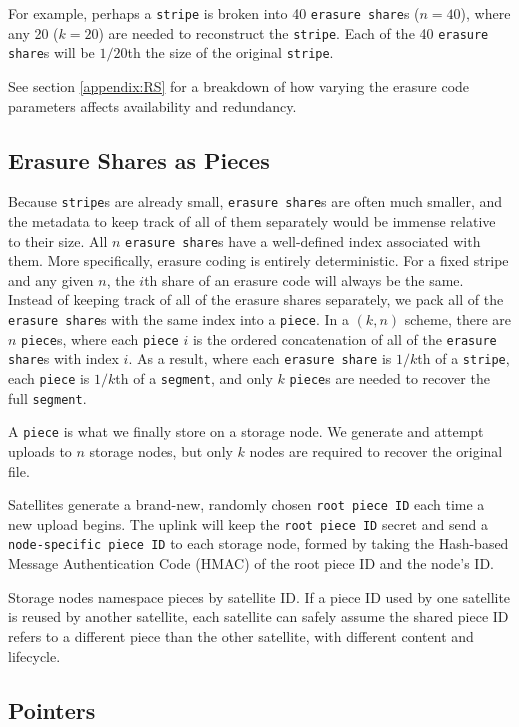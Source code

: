 \documentclass[11pt,fleqn,openany]{book}
\newcommand{\x}[1]{{\tt #1}} \newcommand{\code}[1]{{\em #1}}
\begin{document}
For example, perhaps a \x{stripe} is broken into 40 \x{erasure share}s
($n=40$), where any 20 ($k=20$) are needed to reconstruct the \x{stripe}. Each
of the 40 \x{erasure share}s will be $1/20$th the size of the original
\x{stripe}.

See section \ref{appendix:RS} for a breakdown of how varying the erasure code
parameters affects availability and redundancy.

\subsection{Erasure Shares as Pieces}

Because \x{stripe}s are already small, \x{erasure share}s are often much
smaller, and the metadata to keep track of all of them separately would be
immense relative to their size.
All $n$ \x{erasure share}s have a well-defined index associated
with them. More specifically, erasure coding is entirely deterministic. For
a fixed stripe and any given $n$, the $i$th share of an erasure
code will always be the same.
Instead of keeping track of all of the
erasure shares separately, we pack all of the \x{erasure share}s with the
same index into a \x{piece}.
In a $(k, n)$ scheme, there are $n$ \x{piece}s, where each
\x{piece} $i$ is the ordered concatenation of all of the \x{erasure share}s with
index $i$. As a result, where each \x{erasure share} is $1/k$th of a
\x{stripe}, each \x{piece} is $1/k$th of a \x{segment}, and only $k$
\x{piece}s are needed to recover the full \x{segment}.

A \x{piece} is what
we finally store on a storage node. We generate and attempt uploads to $n$
storage nodes, but only $k$ nodes are required to recover the original file.

Satellites generate a brand-new, randomly chosen \x{root piece ID} each time
a new upload begins. The uplink will keep the \x{root piece ID} secret and send
a \x{node-specific piece ID} to each storage node, formed by taking the Hash-based 
Message Authentication Code (HMAC) of the root piece ID and the node's ID.

Storage nodes namespace pieces by satellite ID. If a piece ID used by one
satellite is reused by another satellite, each satellite can safely assume the shared piece ID refers 
to a different piece than the other satellite, with different content and lifecycle.

\subsection{Pointers}
\end{document}
